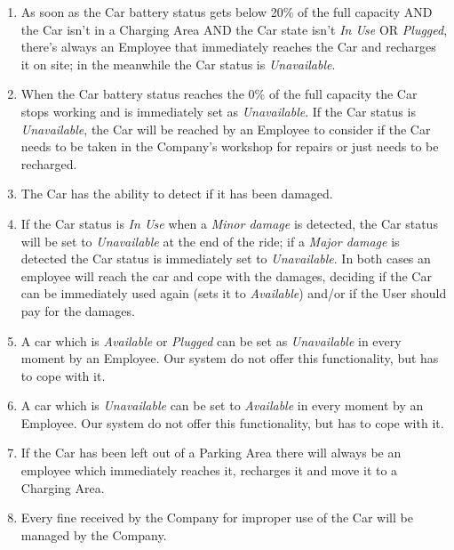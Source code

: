 \begin{enumerate}
	\item As soon as the Car battery status gets below 20\% of the full capacity AND the Car isn't in a Charging Area AND the Car state isn't \textit{In Use} OR \textit{Plugged}, there's always an Employee that immediately reaches the Car and recharges it on site; in the meanwhile the Car status is \textit{Unavailable}.	
	\item When the Car battery status reaches the 0\% of the full capacity the Car stops working and is immediately set as \textit{Unavailable}.
	If the Car status is \textit{Unavailable}, the Car will be reached by an Employee to consider if the Car needs to be taken in the Company's workshop for repairs or just needs to be recharged.
	\item The Car has the ability to detect if it has been damaged. 
	\item If the Car status is \textit{In Use} when a \textit{Minor damage} is detected, the Car status will be set to \textit{Unavailable} at the end of the ride; if a \textit{Major damage} is detected the Car status is immediately set to \textit{Unavailable}. In both cases an employee will reach the car and cope with the damages, deciding if the Car can be immediately used again (sets it to \textit{Available}) and/or if the User should pay for the damages. 
	\item A car which is \textit{Available} or \textit{Plugged} can be set as \textit{Unavailable} in every moment by an Employee. Our system do not offer this functionality, but has to cope with it.
	\item A car which is \textit{Unavailable} can be set to \textit{Available} in every moment by an Employee. Our system do not offer this functionality, but has to cope with it.
	\item If the Car has been left out of a Parking Area there will always be an employee which immediately reaches it, recharges it and move it to a Charging Area. 
	\item Every fine received by the Company for improper use of the Car will be managed by the Company.
	
\end{enumerate}

\clearpage